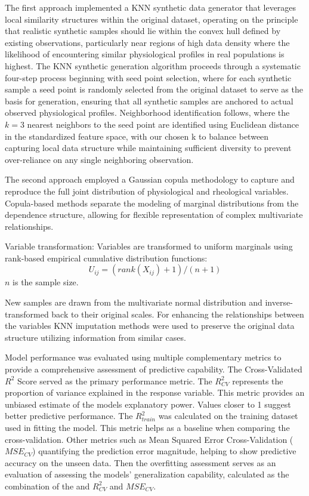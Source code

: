 \documentclass[12pt,letterpaper]{article}
\begin{document}
The first approach implemented a KNN synthetic data generator that leverages local similarity structures within the original dataset,
operating on the principle that realistic synthetic samples should lie within the convex hull defined by existing observations, particularly near regions of high data density where
the likelihood of encountering similar physiological profiles in real populations is highest. The KNN synthetic generation algorithm proceeds through a systematic four-step process
beginning with seed point selection, where for each synthetic sample a seed point is randomly selected from the original dataset to serve as the basis for generation, ensuring that
all synthetic samples are anchored to actual observed physiological profiles. Neighborhood identification follows, where the $k=3$ nearest neighbors to the seed point are identified
using Euclidean distance in the standardized feature space, with our chosen k to balance between capturing local data structure while maintaining sufficient diversity to
prevent over-reliance on any single neighboring observation.

The second approach employed a Gaussian copula methodology to capture and reproduce the full joint distribution of physiological and rheological variables.
Copula-based methods separate the modeling of marginal distributions from the dependence structure, allowing for flexible representation of complex multivariate relationships.

Variable transformation: Variables are transformed to uniform marginals using rank-based empirical cumulative distribution functions:
$$
    U_{ij} = (rank(X_{ij})+1)/(n+1)
$$
$n$ is the sample size.

New samples are drawn from the multivariate normal distribution and inverse-transformed back to their original scales.
For enhancing the relationships between the variables KNN imputation methods were used to preserve the original data structure utilizing information from similar cases.

Model performance was evaluated using multiple complementary metrics to provide a comprehensive assessment of predictive capability.
The Cross-Validated $R^2$ Score served as the primary performance metric. The $R^2_{CV}$ represents the proportion of variance explained in the response variable.
This metric provides an unbiased estimate of the models explanatory power. Values closer to 1 suggest better predictive performance. The $R^2_{train}$ was calculated on the
training dataset used in fitting the model. This metric helps as a baseline when comparing the cross-validation. Other metrics such as Mean Squared Error Cross-Validation ($MSE_{CV}$)
quantifying the prediction error magnitude, helping to show predictive accuracy on the unseen data. Then the overfitting assessment serves as an evaluation of assessing the models'
generalization capability, calculated as the combination of the and $R^2_{CV}$ and $MSE_{CV}$.
\end{document}
